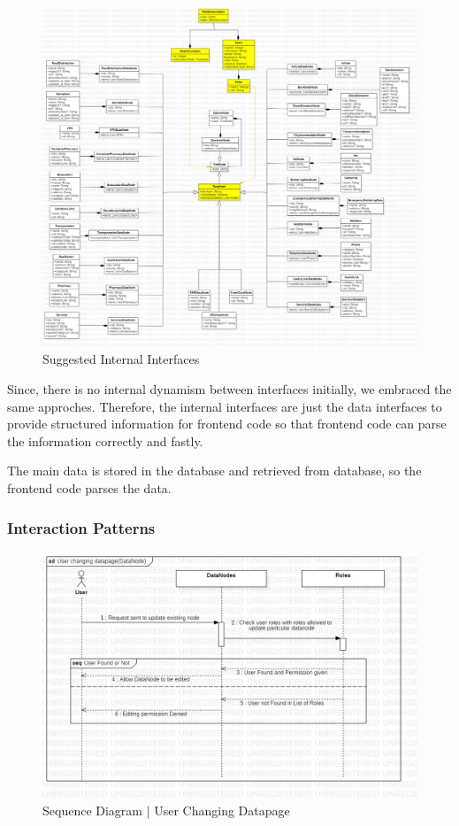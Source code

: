 \begin{figure}[H]
  \centering
  \includegraphics[width=\linewidth]{img/internal-interfaces-diagram-s5.jpg}
  \caption{Suggested Internal Interfaces}
\end{figure}


Since, there is no internal dynamism between interfaces initially, we embraced the same approches. Therefore, the internal interfaces are just the data interfaces to provide structured information for frontend code so that frontend code can parse the information correctly and fastly.

The main data is stored in the database and retrieved from database, so the frontend code parses the data.

\subsubsection{Interaction Patterns}

\begin{figure}[H]
  \centering
  \includegraphics[width=\linewidth]{img/sequence-diagram-1-s5.jpg}
  \caption{Sequence Diagram | User Changing Datapage}
\end{figure}

